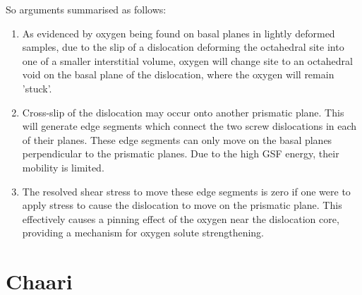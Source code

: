 \documentclass[a4paper,12pt,oneside,print,numbered,index,PageStyleIII]{PhDThesisPSnPDF}
\begin{document}
So arguments summarised as follows:
\begin{enumerate}
\item As evidenced by oxygen being found on basal planes in lightly
deformed samples, due to the slip of a dislocation deforming the
octahedral site into one of a smaller interstitial volume,
oxygen will change site to an octahedral void on the basal plane
of the dislocation, where the oxygen will remain 'stuck'.
\item Cross-slip of the dislocation may occur onto another prismatic
plane. This will generate edge segments which connect the two
screw dislocations in each of their planes. These edge segments
can only move on the basal planes perpendicular to the prismatic
planes. Due to the high GSF energy, their mobility is limited.
\item The resolved shear stress to move these edge segments is zero if
one were to apply stress to cause the dislocation to move on the
prismatic plane. This effectively causes a pinning effect of the
oxygen near the dislocation core, providing a mechanism for
oxygen solute strengthening.
\end{enumerate}

\section{Chaari}
\label{sec:org44a820d}
\end{document}
